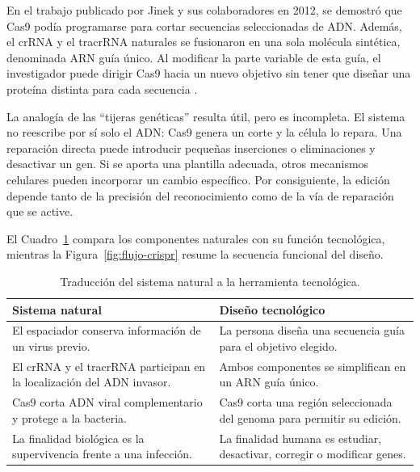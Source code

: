 \documentclass[11pt,letterpaper]{article}
\begin{document}
En el trabajo publicado por Jinek y sus colaboradores en 2012, se demostró que
Cas9 podía programarse para cortar secuencias seleccionadas de ADN. Además, el
crRNA y el tracrRNA naturales se fusionaron en una sola molécula sintética,
denominada ARN guía único. Al modificar la parte variable de esta guía, el
investigador puede dirigir Cas9 hacia un nuevo objetivo sin tener que diseñar
una proteína distinta para cada secuencia \parencite{jinek2012}.

La analogía de las ``tijeras genéticas'' resulta útil, pero es incompleta. El
sistema no reescribe por sí solo el ADN: Cas9 genera un corte y la célula lo
repara. Una reparación directa puede introducir pequeñas inserciones o
eliminaciones y desactivar un gen. Si se aporta una plantilla adecuada, otros
mecanismos celulares pueden incorporar un cambio específico. Por consiguiente,
la edición depende tanto de la precisión del reconocimiento como de la vía de
reparación que se active.

El Cuadro~\ref{tab:traduccion-crispr} compara los componentes naturales con su
función tecnológica, mientras la Figura~\ref{fig:flujo-crispr} resume la
secuencia funcional del diseño.

\begin{table}[ht]
  \centering
  \small
  \caption{Traducción del sistema natural a la herramienta tecnológica.}
  \label{tab:traduccion-crispr}
  \begin{tabularx}{\textwidth}{@{}>{\raggedright\arraybackslash}X
    >{\raggedright\arraybackslash}X@{}}
    \toprule
    \textbf{Sistema natural} & \textbf{Diseño tecnológico} \\
    \midrule
    El espaciador conserva información de un virus previo.
      & La persona diseña una secuencia guía para el objetivo elegido. \\
    El crRNA y el tracrRNA participan en la localización del ADN invasor.
      & Ambos componentes se simplifican en un ARN guía único. \\
    Cas9 corta ADN viral complementario y protege a la bacteria.
      & Cas9 corta una región seleccionada del genoma para permitir su edición. \\
    La finalidad biológica es la supervivencia frente a una infección.
      & La finalidad humana es estudiar, desactivar, corregir o modificar genes. \\
    \bottomrule
  \end{tabularx}
\end{table}
\end{document}
